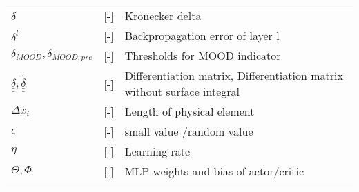 \begin{tabular}{lll}
   $\delta$              & [-]             & Kronecker delta\\     
   \vspace{1mm}
   $\delta^l$              & [-]             & Backpropagation error of layer l\\ 
      \vspace{1mm}
           $\delta_{MOOD},\delta_{MOOD,pre}$              & [-]             & Thresholds for MOOD indicator \\ 
    \vspace{1mm}
        $\underline{\underline{\delta}},\underline{\underline{\tilde{\delta}}}$              & [-]             & Differentiation matrix, Differentiation matrix without surface integral\\
    \vspace{1mm}
      $\Delta x_i$              & [-]             & Length of physical element \\
   	\vspace{1mm}
      $\epsilon$              & [-]             & small value /random value\\ 
      \vspace{1mm}
   $\eta$              & [-]             & Learning rate\\ 
   	\vspace{1mm}
   $\Theta,\Phi$              & [-]             & MLP weights and bias of actor/critic\\ 
     \vspace{1mm}
\end{tabular}



